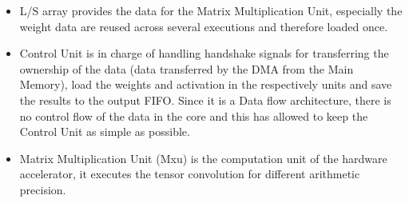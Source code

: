 \begin{itemize}
\item L/S array provides the data for the Matrix Multiplication Unit, especially the weight data are reused across several executions and therefore loaded once.
\item Control Unit is in charge of handling handshake signals for transferring the ownership of the data (data transferred by the DMA from the Main Memory), load the weights and activation in the respectively units and save the results to the output FIFO. Since it is a Data flow architecture, there is no control flow of the data in the core and this has allowed to keep the Control Unit as simple as possible.
\item Matrix Multiplication Unit (Mxu) is the computation unit of the hardware accelerator, it executes the tensor convolution for different arithmetic precision.
\end{itemize}
\newpage

